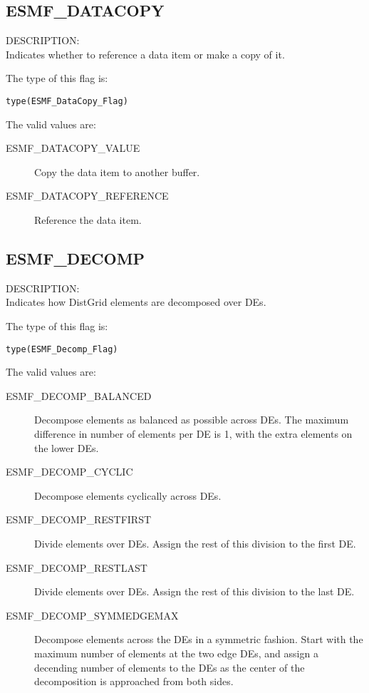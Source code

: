 \subsection{ESMF\_DATACOPY}
\label{const:datacopyflag}
{\sf DESCRIPTION:\\}
Indicates whether to reference a data item or make a copy of it.

The type of this flag is:

{\tt type(ESMF\_DataCopy\_Flag)}

The valid values are:
\begin{description}
\item [ESMF\_DATACOPY\_VALUE]
      Copy the data item to another buffer.
\item [ESMF\_DATACOPY\_REFERENCE]
      Reference the data item.
\end{description}

\subsection{ESMF\_DECOMP}
\label{const:decompflag}
{\sf DESCRIPTION:\\}
Indicates how DistGrid elements are decomposed over DEs.

The type of this flag is:

{\tt type(ESMF\_Decomp\_Flag)}

The valid values are:
\begin{description}
\item [ESMF\_DECOMP\_BALANCED]
      Decompose elements as balanced as possible across DEs. The maximum 
      difference in number of elements per DE is 1, with the extra elements on
      the lower DEs.
\item [ESMF\_DECOMP\_CYCLIC]
      Decompose elements cyclically across DEs.
\item [ESMF\_DECOMP\_RESTFIRST]
      Divide elements over DEs. Assign the rest of this division to the first
      DE.
\item [ESMF\_DECOMP\_RESTLAST]
      Divide elements over DEs. Assign the rest of this division to the last DE.
\item [ESMF\_DECOMP\_SYMMEDGEMAX]
      Decompose elements across the DEs in a symmetric fashion. Start with the
      maximum number of elements at the two edge DEs, and assign a decending
      number of elements to the DEs as the center of the decomposition is 
      approached from both sides.
\end{description}

